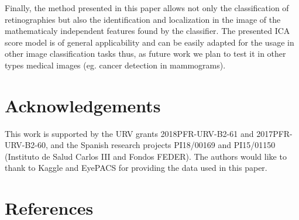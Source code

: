 \documentclass[review]{elsarticle}
\theoremstyle{definition} %
\theoremstyle{remark}
\begin{document}
Finally, the method presented in this paper allows not only the classification of retinographies but also the identification and localization in the image of the mathematicaly independent features found by the classifier. The presented ICA score model is of general applicability and can be easily adapted for the usage in other image classification tasks thus, as future work we plan to test it in other types medical images (eg. cancer detection in mammograms).


\section*{Acknowledgements}

This work is supported by the URV grants 2018PFR-URV-B2-61 and 2017PFR-URV-B2-60, and the Spanish research projects PI18/00169 and PI15/01150 (Instituto de Salud Carlos III and Fondos FEDER). The authors would like to thank to Kaggle and EyePACS for providing the data used in this paper.

\section*{References}


\end{document}
